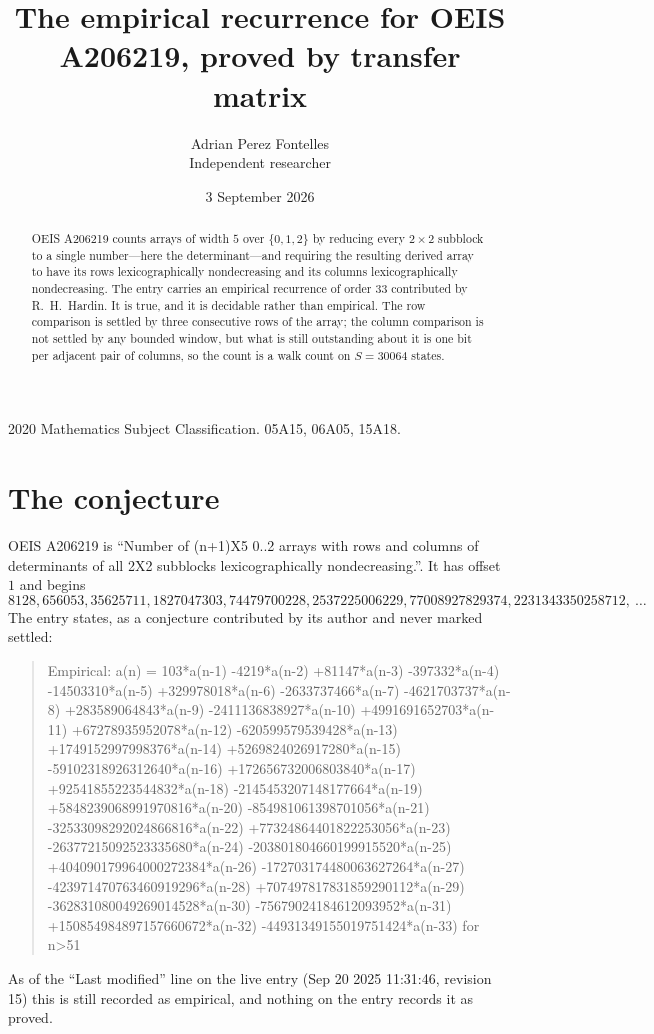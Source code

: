 \documentclass[11pt,a4paper]{article}
\title{The empirical recurrence for OEIS A206219, proved by transfer matrix}
\author{Adrian Perez Fontelles\\ \small Independent researcher}
\date{3 September 2026}
\theoremstyle{plain}
\theoremstyle{definition}
\begin{document}
\maketitle

\begin{abstract}
OEIS A206219 counts arrays of width $5$ over $\{0,1,2\}$ by reducing every $2\times2$ subblock to a
single number---here the determinant---and requiring the resulting derived array to have its rows
lexicographically nondecreasing and its columns lexicographically nondecreasing. The entry carries an
empirical recurrence of order $33$ contributed by R.~H.~Hardin. It is true, and it is
decidable rather than empirical. The row comparison is settled by three consecutive rows of the
array; the column comparison is not settled by any bounded window, but what is still outstanding
about it is one bit per adjacent pair of columns, so the count is a walk count on $S=30064$
states.
\end{abstract}

\noindent\small 2020 Mathematics Subject Classification. 05A15, 06A05, 15A18.\normalsize

\section{The conjecture}

OEIS A206219 is ``Number of (n+1)X5 0..2 arrays with rows and columns of determinants of all 2X2 subblocks lexicographically nondecreasing.''. It has offset $1$ and begins
\[
8128, 656053, 35625711, 1827047303, 74479700228, 2537225006229, 77008927829374, 2231343350258712,\ \dots
\]
The entry states, as a conjecture contributed by its author and never marked settled:
\begin{quote}
Empirical: a(n) = 103*a(n-1) -4219*a(n-2) +81147*a(n-3) -397332*a(n-4) -14503310*a(n-5) +329978018*a(n-6) -2633737466*a(n-7) -4621703737*a(n-8) +283589064843*a(n-9) -2411136838927*a(n-10) +4991691652703*a(n-11) +67278935952078*a(n-12) -620599579539428*a(n-13) +1749152997998376*a(n-14) +5269824026917280*a(n-15) -59102318926312640*a(n-16) +172656732006803840*a(n-17) +92541855223544832*a(n-18) -2145453207148177664*a(n-19) +5848239068991970816*a(n-20) -854981061398701056*a(n-21) -32533098292024866816*a(n-22) +77324864401822253056*a(n-23) -26377215092523335680*a(n-24) -203801804660199915520*a(n-25) +404090179964000272384*a(n-26) -172703174480063627264*a(n-27) -423971470763460919296*a(n-28) +707497817831859290112*a(n-29) -362831080049269014528*a(n-30) -75679024184612093952*a(n-31) +150854984897157660672*a(n-32) -44931349155019751424*a(n-33) for n>51
\end{quote}
As of the ``Last modified'' line on the live entry (Sep 20 2025 11:31:46, revision 15) this is still
recorded as empirical, and nothing on the entry records it as proved.
\end{document}

